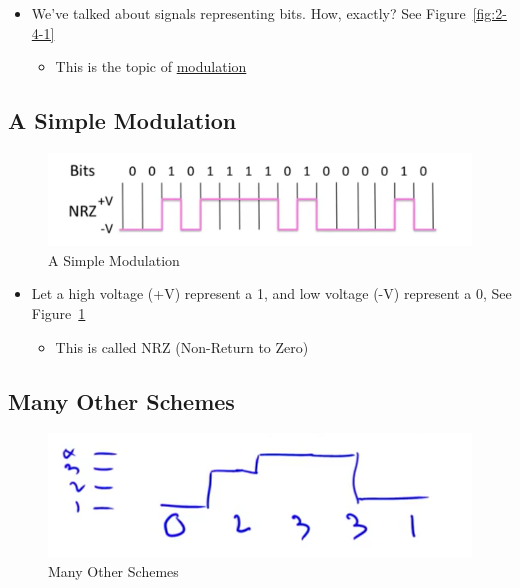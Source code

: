 \documentclass[12pt]{ctexart}   %
\begin{document}
	 \begin{itemize}
	 	\item We've talked about signals representing bits. How, exactly? See Figure~\ref{fig:2-4-1}
	 	\begin{itemize}
	 		\item This is the topic of \underline{modulation}
	 	\end{itemize}
	 \end{itemize}
	 
	 \subsection{A Simple Modulation}
	 \begin{figure}[h!] %
	 \centering
	 \includegraphics[scale=0.7]{images/2-4-2}
	\caption{ A Simple Modulation}
	 \label{fig:2-4-2}
	 \end{figure}
	 
	 \begin{itemize}
	 	\item Let a high voltage (+V) represent a 1, and low voltage (-V) represent a 0, See Figure~\ref{fig:2-4-2}
	 	\begin{itemize}
	 		\item This is called NRZ (Non-Return to Zero)
	 	\end{itemize}
	 \end{itemize}
	 
	 \subsection{Many Other Schemes}
	 \begin{figure}[h!] %
	 \centering
	 \includegraphics[scale=0.7]{images/2-4-3}
	\caption{ Many Other Schemes}
	 \label{fig:2-4-3}
	 \end{figure}
	 
\end{document}
